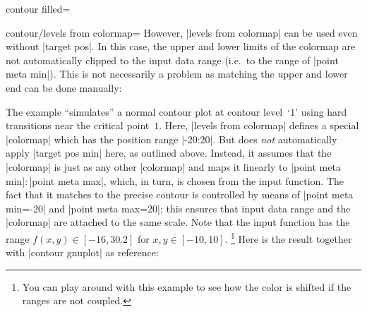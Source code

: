 {{\begin{plottype}[/pgfplots]{
    contour filled=\textcolor{black}{}%
}
\begin{pgfplotskey}{contour/levels from colormap=}
		However, |levels from colormap| can be used even without |target pos|.
		In this case, the upper and lower limits of the colormap are
		not automatically clipped to the input data range (i.e.\ to
		the range of |point meta min|). This is not necessarily a problem as matching the upper and lower end can be done manually:
\pgfplotsexpensiveexample
\begin{codeexample}[]
\end{codeexample}
        The example ``simulates'' a normal contour plot at contour level~`$1$'
        using hard transitions near the critical point~$1$. Here,
        |levels from colormap| defines a special |colormap| which has the
        position range |-20:20|. But \PGFPlots{} does \emph{not} automatically
        apply |target pos min| here, as outlined above. Instead, it assumes that the |colormap| is just
        as any other |colormap| and maps it linearly to
        |point meta min|$:$|point meta max|, which, in turn, is chosen from the
        input function. The fact that it matches to the precise contour is controlled by means of |point meta min=-20| and |point meta max=20|; this ensures that input data range and the |colormap| are attached to the same scale.  Note that the input function has the range $f(x,y) \in
        [-16,30.2]$ for $x,y \in [-10,10]$. 
		\footnote{You
        can play around with this example to see how the color is shifted if
        the ranges are not coupled.} Here is the result together with |contour gnuplot| as
        reference:
\pgfplotsexpensiveexample
\begin{codeexample}[]
\end{codeexample}
\end{pgfplotskey}
\end{plottype}}}
